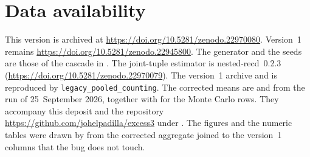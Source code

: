 \documentclass[11pt,a4paper]{article}
\begin{document}
\section*{Data availability}
This version is archived at
\url{https://doi.org/10.5281/zenodo.22970080}.
Version~1 remains
\url{https://doi.org/10.5281/zenodo.22945800}.
The generator and the seeds are those of the cascade in
\citet{Padilla2026framework}. The joint-tuple estimator is
nested-recd~0.2.3
(\url{https://doi.org/10.5281/zenodo.22970079}).
The version~1 archive
 and
is reproduced by \texttt{legacy\_pooled\_counting}.
The corrected means are
 and 
from the run of 25~September 2026, together with
 for the Monte Carlo rows.
They accompany this deposit and the repository
\url{https://github.com/johelpadilla/excess3}
under .
The figures and the numeric tables were drawn by
 from the corrected aggregate joined to the
version~1 columns that the bug does not touch.



\end{document}
